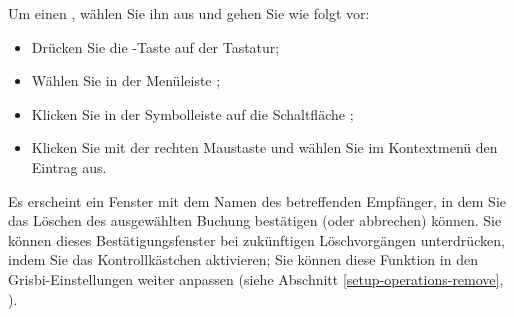 Um einen , wählen Sie ihn aus und gehen Sie wie folgt vor:
\begin{itemize}
	\item Drücken Sie die -Taste auf der Tastatur;
	\item Wählen Sie in der Menüleiste ;
	\item Klicken Sie in der Symbolleiste auf die Schaltfläche ;
	\item Klicken Sie mit der rechten Maustaste und wählen Sie im Kontextmenü den Eintrag  aus.
\end{itemize}

Es erscheint ein Fenster mit dem Namen des betreffenden Empfänger, in dem Sie das Löschen des ausgewählten Buchung bestätigen (oder abbrechen) können. Sie können dieses Bestätigungsfenster bei zukünftigen Löschvorgängen unterdrücken, indem Sie das Kontrollkästchen  aktivieren; Sie können diese Funktion in den Grisbi-Einstellungen weiter anpassen (siehe Abschnitt \vref{setup-operations-remove}, ).

